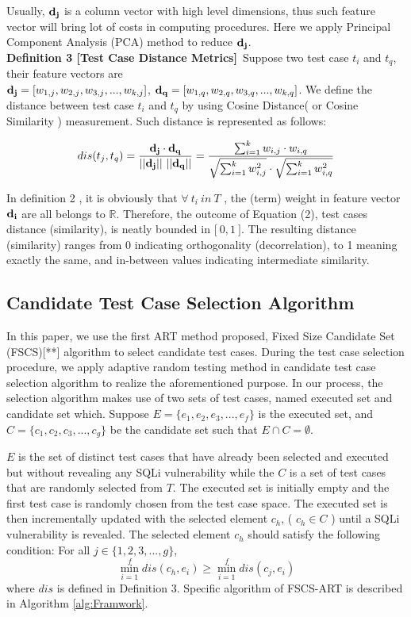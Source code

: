 \documentclass{sig-alternate}
\begin{document}
Usually, ${\bf  d_{j}}$ is a column vector with high level dimensions, thus such feature vector will bring lot of costs in computing procedures. Here we apply Principal Component Analysis (PCA) method to reduce ${\bf  d_{j}}$.\\

{\bf Definition 3 [Test Case Distance Metrics]}~Suppose two test case $t_{i}$ and $t_{q}$, their feature vectors are\\ ${\bf d_{j}} = [w_{1,j}, w_{2,j}, w_{3,j},...,w_{k,j}]$, ${\bf d_{q}} = [w_{1,q}, w_{2,q}, w_{3,q},...,w_{k,q}]$. We define the distance between test case $t_{i}$ and $t_{q}$ by using Cosine Distance( or Cosine Similarity ) measurement. Such distance is represented as follows:

\begin{equation}dis(t_{j}, t_{q}) = \frac{  {\bf d_{j}} \cdot {\bf d_{q} } }{ || {\bf d_{j} } || ~||  {\bf d_{q}} || } = \frac{ \sum_{i=1}^{k} w_{i,j}\cdot w_{i,q} }{\sqrt{  \sum_{i=1}^{k} w_{i,j}^{2} } \cdot \sqrt{ \sum_{i=1}^{k} w_{i,q}^{2}  }  }\end{equation}

In definition 2 , it is obviously that $\forall ~t_{i}~ in ~T$ , the (term) weight in feature vector $\bf d_{i}$ are all belongs to $\mathbb{R}$. Therefore, the outcome of Equation (2), test cases distance (similarity), is neatly bounded in $\lbrack ~0, 1 ~\rbrack$. The resulting distance (similarity) ranges from 0 indicating orthogonality (decorrelation), to 1 meaning exactly the same, and in-between values indicating intermediate similarity.




\subsection{Candidate Test Case Selection Algorithm}
In this paper,  we use the first ART method proposed, Fixed Size Candidate Set (FSCS)[**] algorithm to select candidate test cases. During the test case selection procedure, we apply adaptive random testing method in candidate test case selection algorithm to realize the aforementioned purpose. In our process, the selection algorithm makes use of two sets of test cases, named executed set and candidate set which. Suppose $E = \{e_{1}, e_{2}, e_{3}, ..., e_{f}\}$ is the executed set, and $C= \{c_{1}, c_{2}, c_{3}, ..., c_{g}\}$ be the candidate set such that $E \cap C = \emptyset$.  


 $E$ is the set of distinct test cases that have already been selected and executed but without revealing any SQLi vulnerability while the $C$ is a set of test cases that are randomly selected from $T$. The executed set is initially empty and the first test case is randomly chosen from the test case space. The executed set is then incrementally updated with the selected element $c_{h}$, ( $c_{h} \in C$ ) until a SQLi vulnerability is revealed. The selected element $c_{h}$ should satisfy the following condition:
For all $ j \in \{1, 2, 3, ..., g\} $, $$\min_{i=1}^{f} dis(c_{h}, e_{i}) \geq \min_{i=1}^{f} dis(c_{j}, e_{i}) $$
where $dis$ is defined in Definition 3. Specific algorithm of FSCS-ART is described in Algorithm \ref{alg:Framwork}.
\end{document}
